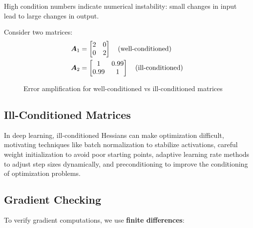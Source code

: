 High condition numbers indicate numerical instability: small changes in input lead to large changes in output.

\begin{example}
Consider two matrices:
\begin{align}
\boldsymbol{A}_1 &= \begin{bmatrix} 2 & 0 \\ 0 & 2 \end{bmatrix} \quad \text{(well-conditioned)} \\
\boldsymbol{A}_2 &= \begin{bmatrix} 1 & 0.99 \\ 0.99 & 1 \end{bmatrix} \quad \text{(ill-conditioned)}
\end{align}
\end{example}

\begin{figure}[h]
\centering
{}
\caption{Error amplification for well-conditioned vs ill-conditioned matrices}
\label{fig:condition-number}
\end{figure}

\subsection{Ill-Conditioned Matrices}

In deep learning, ill-conditioned Hessians can make optimization difficult, motivating techniques like batch normalization to stabilize activations, careful weight initialization to avoid poor starting points, adaptive learning rate methods to adjust step sizes dynamically, and preconditioning to improve the conditioning of optimization problems.

\subsection{Gradient Checking}

To verify gradient computations, we use \textbf{finite differences}:

